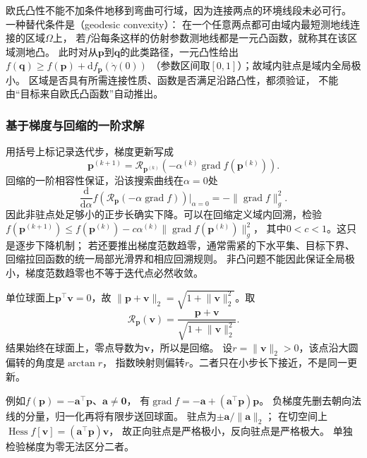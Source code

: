 欧氏凸性不能不加条件地移到弯曲可行域，因为连接两点的环境线段未必可行。
一种替代条件是（geodesic convexity）：
在一个任意两点都可由域内最短测地线连接的区域$\Omega$上，
若$f$沿每条这样的仿射参数测地线都是一元凸函数，就称其在该区域测地凸。
此时对从$\bm p$到$\bm q$的此类路径，一元凸性给出
$f(\bm q)\geq f(\bm p)+\mathrm df_{\bm p}(\dot\gamma(0))$
（参数区间取$[0,1]$）；故域内驻点是域内全局极小。
区域是否具有所需连接性质、函数是否满足沿路凸性，都须验证，
不能由“目标来自欧氏凸函数”自动推出。

\subsubsection{基于梯度与回缩的一阶求解}
\label{sec:geometry-riemannian-gradient-method}

用括号上标记录迭代步，梯度更新写成
\begin{equation}
 \bm p^{(k+1)}=\mathcal R_{\bm p^{(k)}}
       (-\alpha^{(k)}\operatorname{grad}f(\bm p^{(k)})).
 \label{eq:geometry-riemannian-gradient-step}
\end{equation}
回缩的一阶相容性保证，沿该搜索曲线在$\alpha=0$处
\[
 \frac{\mathrm d}{\mathrm d\alpha}
 f(\mathcal R_{\bm p}(-\alpha\operatorname{grad}f))
 \bigg|_{\alpha=0}=-\lVert\operatorname{grad}f\rVert_g^2.
\]
因此非驻点处足够小的正步长确实下降。可以在回缩定义域内回溯，检验
$f(\bm p^{(k+1)})\leq f(\bm p^{(k)})
-c\alpha^{(k)}\lVert\operatorname{grad}f(\bm p^{(k)})\rVert_g^2$，
其中$0<c<1$。这只是逐步下降机制；
若还要推出梯度范数趋零，通常需紧的下水平集、目标下界、
回缩拉回函数的统一局部光滑界和相应回溯规则。
非凸问题不能因此保证全局极小，梯度范数趋零也不等于迭代点必然收敛。

\begin{example}[球面上的归一化更新]
\label{ex:geometry-sphere-retraction}
单位球面上$\bm p^\top\bm v=0$，故
$\lVert\bm p+\bm v\rVert_2=\sqrt{1+\lVert\bm v\rVert_2^2}$。取
\begin{equation}
 \mathcal R_{\bm p}(\bm v)
 =\frac{\bm p+\bm v}{\sqrt{1+\lVert\bm v\rVert_2^2}}.
 \label{eq:geometry-sphere-retraction}
\end{equation}
结果始终在球面上，零点导数为$\bm v$，所以是回缩。
设$r=\lVert\bm v\rVert_2>0$，该点沿大圆偏转的角度是$\arctan r$，
指数映射则偏转$r$。二者只在小步长下接近，不是同一更新。

例如$f(\bm p)=-\bm a^\top\bm p$、$\bm a\neq\bm0$，
有$\operatorname{grad}f=-\bm a+(\bm a^\top\bm p)\bm p$。
负梯度先删去朝向法线的分量，归一化再将有限步送回球面。
驻点为$\pm\bm a/\lVert\bm a\rVert_2$；
在切空间上$\operatorname{Hess}f[\bm v]=(\bm a^\top\bm p)\bm v$，
故正向驻点是严格极小，反向驻点是严格极大。
单独检验梯度为零无法区分二者。
\end{example}

